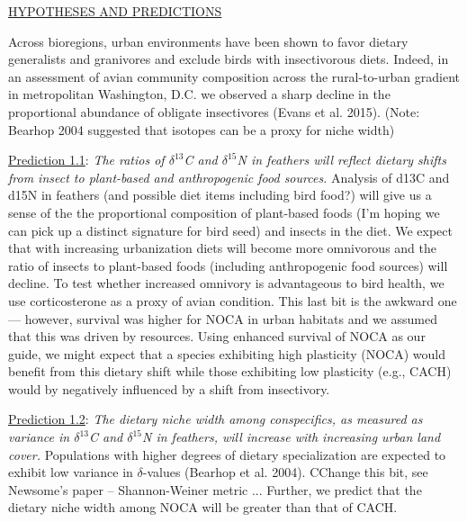 \documentclass[12pt]{article}
\begin{document}
\par


\noindent \underline{HYPOTHESES AND PREDICTIONS}\par


 Across bioregions, urban environments have been shown to favor dietary generalists and granivores and exclude birds with insectivorous diets. Indeed, in an assessment of avian community composition across the rural-to-urban gradient in metropolitan Washington, D.C. we observed a sharp decline in the proportional abundance of obligate insectivores (Evans et al. 2015). (Note: Bearhop 2004 suggested that isotopes can be a proxy for niche width)\par


\noindent \underline{Prediction 1.1}: \textit{The ratios of $\delta^{13}$C and $\delta^{15}$N in feathers will reflect dietary shifts from insect to plant-based and anthropogenic food sources.}  Analysis of d13C and d15N in feathers (and possible diet items including bird food?) will give us a sense of the the proportional composition of plant-based foods (I’m hoping we can pick up a distinct signature for bird seed) and insects in the diet. We expect that with increasing urbanization diets will become more omnivorous and the ratio of insects to plant-based foods (including anthropogenic food sources) will decline. To test whether increased omnivory is advantageous to bird health, we use corticosterone as a proxy of avian condition. This last bit is the awkward one — however, survival was higher for NOCA in urban habitats and we assumed that this was driven by resources. Using enhanced survival of NOCA as our guide, we might expect that a species exhibiting high plasticity (NOCA) would benefit from this dietary shift while those exhibiting low plasticity (e.g., CACH) would by negatively influenced by a shift from insectivory.\par


\noindent \underline{Prediction 1.2}: \textit{ The dietary niche width among conspecifics, as measured as variance in $\delta^{13}$C and $\delta^{15}$N in feathers,  will increase with increasing urban land cover.} Populations with higher degrees of dietary specialization are expected to exhibit low variance in $\delta$-values (Bearhop et al. 2004). CChange this bit, see Newsome's paper -- Shannon-Weiner metric ... Further, we predict that the dietary niche width among NOCA will be greater than that of CACH. \par
\end{document}
